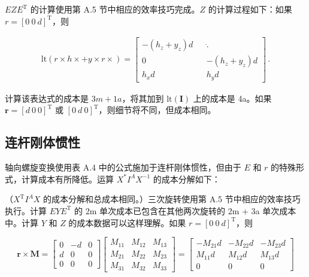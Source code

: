 \documentclass[10pt,a4paper]{book}
\theoremstyle{thmstyle} %
\theoremstyle{defstyle} %
\theoremstyle{prostyle} %
\begin{document}
$EZE^{\mathrm{T}}$ 的计算使用第 A.5 节中相应的效率技巧完成。$Z$ 的计算过程如下：如果 $r=[0\ 0\ d]^{\mathrm{T}}$，则



$$
\begin{array}{r} { \mathrm { l t } ( r \times h \times + y \times r \times ) = \left[ \begin{array}{lll} { - ( h _ { z } + y _ { z } ) d } & { } & { \dot { . } } \\{ 0 } & { } & { - ( h _ { z } + y _ { z } ) d } \\{ h _ { x } d } & { } & { h _ { y } d } \end{array} \right] \, . } \end{array}
$$



计算该表达式的成本是 $3m + 1a$，将其加到 $\text{lt}(\boldsymbol{I})$ 上的成本是 4a。如果 $\boldsymbol{r} = [d \ 0 \ 0]^{\text{T}}$ 或 $[0 \ d \ 0]^{\text{T}}$，则细节将不同，但成本相同。



\subsection{连杆刚体惯性}





轴向螺旋变换使用表 A.4 中的公式施加于连杆刚体惯性，但由于 $E$ 和 $r$ 的特殊形式，计算成本有所降低。运算 $X^*I^A X^{-1}$ 的成本分解如下：





（$X^{\mathrm{T}}I^{A}X$ 的成本分解和总成本相同。）三次旋转使用第 A.5 节中相应的效率技巧执行。计算 $EYE^{\mathrm{T}}$ 的 2m 单次成本已包含在其他两次旋转的 2m + 3a 单次成本中。计算 $Y$ 和 $Z$ 的成本数据可以这样理解。如果 $r = [0\ 0\ d]^{\mathrm{T}}$，则



$$
\boldsymbol{ r } \times \boldsymbol{ M } = \left[ \begin{array}{lll} { 0 } & { - d } & { 0 } \\{ d } & { 0 } & { 0 } \\{ 0 } & { 0 } & { 0 } \end{array} \right] \left[ \begin{array}{lll} { M _ { 11 } } & { M _ { 12 } } & { M _ { 13 } } \\{ M _ { 21 } } & { M _ { 22 } } & { M _ { 23 } } \\{ M _ { 31 } } & { M _ { 32 } } & { M _ { 33 } } \end{array} \right] = \left[ \begin{array}{lll} { - M _ { 21 } d } & { - M _ { 22 } d } & { - M _ { 23 } d } \\{ M _ { 11 } d } & { M _ { 12 } d } & { M _ { 13 } d } \\{ 0 } & { 0 } & { 0 } \end{array} \right]
$$
\end{document}
